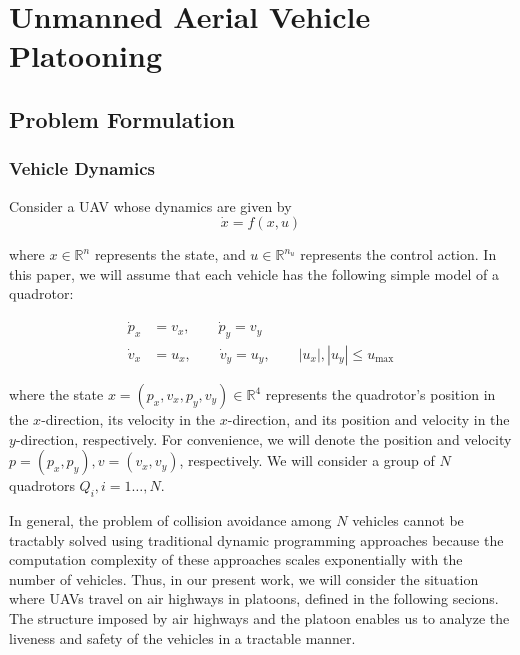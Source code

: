 \section{Unmanned Aerial Vehicle Platooning}
\subsection{Problem Formulation}
\subsubsection{Vehicle Dynamics}
Consider a UAV whose dynamics are given by
\begin{equation}
\dot{x} = f(x,u)
\end{equation}

\noindent where $x\in\mathbb{R}^n$ represents the state, and $u\in\mathbb{R}^{n_u}$ represents the control action. In this paper, we will assume that each vehicle has the following simple model of a quadrotor:

\begin{equation} \label{eq:dyn}
\begin{aligned}
\dot{p}_x &= v_x, \qquad \dot{p}_y = v_y  \\
\dot{v}_x &= u_x, \qquad \dot{v}_y = u_y, \qquad |u_x|,|u_y| \le u_\text{max}
\end{aligned}
\end{equation}

\noindent where the state $x=(p_x, v_x, p_y, v_y)\in\mathbb{R}^4$ represents the quadrotor's position in the $x$-direction, its velocity in the $x$-direction, and its position and velocity in the $y$-direction, respectively. For convenience, we will denote the position and velocity $p=(p_x, p_y),v=(v_x,v_y)$, respectively. We will consider a group of $N$ quadrotors $Q_i, i=1\ldots,N$.

In general, the problem of collision avoidance among $N$ vehicles cannot be tractably solved using traditional dynamic programming approaches because the computation complexity of these approaches scales exponentially with the number of vehicles. Thus, in our present work, we will consider the situation where UAVs travel on air highways in platoons, defined in the following secions. The structure imposed by air highways and the platoon enables us to analyze the liveness and safety of the vehicles in a tractable manner.

